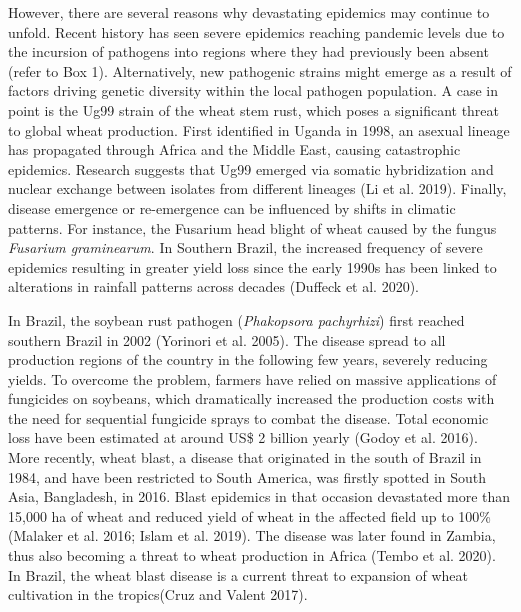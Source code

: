 \documentclass[
  letterpaper,
]{book}
\begin{document}
However, there are several reasons why devastating epidemics may
continue to unfold. Recent history has seen severe epidemics reaching
pandemic levels due to the incursion of pathogens into regions where
they had previously been absent (refer to Box 1). Alternatively, new
pathogenic strains might emerge as a result of factors driving genetic
diversity within the local pathogen population. A case in point is the
Ug99 strain of the wheat stem rust, which poses a significant threat to
global wheat production. First identified in Uganda in 1998, an asexual
lineage has propagated through Africa and the Middle East, causing
catastrophic epidemics. Research suggests that Ug99 emerged via somatic
hybridization and nuclear exchange between isolates from different
lineages (Li et al. 2019). Finally, disease emergence or re-emergence
can be influenced by shifts in climatic patterns. For instance, the
Fusarium head blight of wheat caused by the fungus \emph{Fusarium
graminearum}. In Southern Brazil, the increased frequency of severe
epidemics resulting in greater yield loss since the early 1990s has been
linked to alterations in rainfall patterns across decades (Duffeck et
al. 2020).

\begin{tcolorbox}[enhanced jigsaw, titlerule=0mm, rightrule=.15mm, colbacktitle=quarto-callout-note-color!10!white, opacitybacktitle=0.6, toptitle=1mm, leftrule=.75mm, colback=white, colframe=quarto-callout-note-color-frame, bottomrule=.15mm, toprule=.15mm, breakable, bottomtitle=1mm, coltitle=black, title=\textcolor{quarto-callout-note-color}{\faInfo}\hspace{0.5em}{Box 1: Diseases on the move}, arc=.35mm, opacityback=0, left=2mm]

In Brazil, the soybean rust pathogen (\emph{Phakopsora pachyrhizi})
first reached southern Brazil in 2002 (Yorinori et al. 2005). The
disease spread to all production regions of the country in the following
few years, severely reducing yields. To overcome the problem, farmers
have relied on massive applications of fungicides on soybeans, which
dramatically increased the production costs with the need for sequential
fungicide sprays to combat the disease. Total economic loss have been
estimated at around US\$ 2 billion yearly (Godoy et al. 2016). More
recently, wheat blast, a disease that originated in the south of Brazil
in 1984, and have been restricted to South America, was firstly spotted
in South Asia, Bangladesh, in 2016. Blast epidemics in that occasion
devastated more than 15,000 ha of wheat and reduced yield of wheat in
the affected field up to 100\% (Malaker et al. 2016; Islam et al. 2019).
The disease was later found in Zambia, thus also becoming a threat to
wheat production in Africa (Tembo et al. 2020). In Brazil, the wheat
blast disease is a current threat to expansion of wheat cultivation in
the tropics(Cruz and Valent 2017).

\end{tcolorbox}
\end{document}
